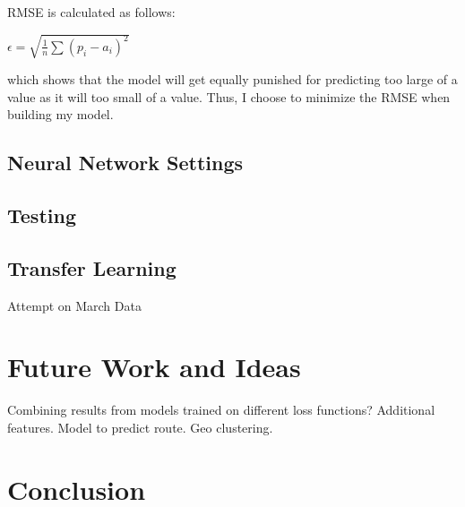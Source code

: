 \documentclass[conference]{IEEEtran}
\begin{document}
RMSE is calculated as follows:

$\epsilon = \sqrt{\frac{1}{n} \sum{(p_i - a_i)^2}}$

which shows that the model will get equally punished for predicting too large of a value as it will too small of a value.  Thus, I choose to minimize the RMSE when building my model.

\subsection{Neural Network Settings}


\subsection{Testing}

\subsection{Transfer Learning}
Attempt on March Data


\section{Future Work and Ideas}
Combining results from models trained on different loss functions?
Additional features.
Model to predict route.
Geo clustering.




\section{Conclusion}














%
\end{document}
